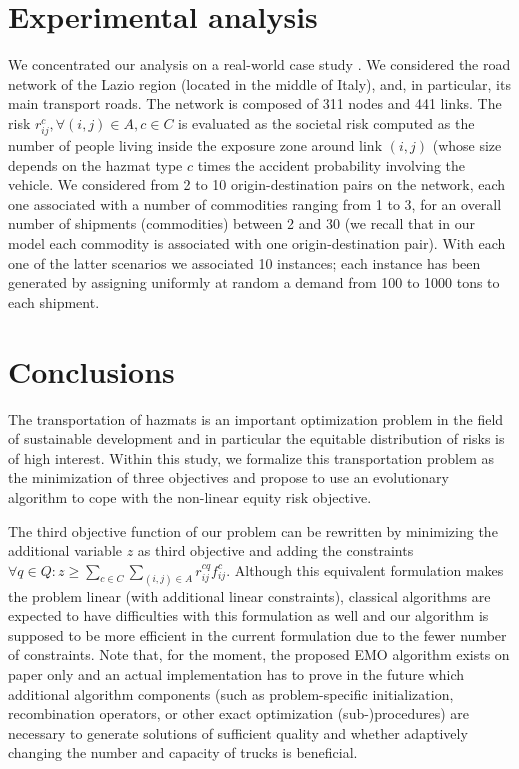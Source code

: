 \documentclass[preprint,12pt]{elsarticle}
\begin{document}
\section{Experimental analysis}

We concentrated our analysis on a real-world case study \cite{bianco09}. We considered the road network of the Lazio region (located in the middle of Italy), and, in particular, its main transport roads. The network is composed of 311 nodes and 441 links. The risk $r_{ij}^c, \forall (i,j) \in A, c \in C$ is evaluated as the societal risk computed as the number of people living inside the exposure zone around link $(i,j)$ (whose size depends on the hazmat type $c$ times the accident probability involving the vehicle. We considered from 2 to 10 origin-destination pairs on the network, each one associated with a number of commodities ranging from 1 to 3, for an overall number of shipments (commodities) between 2 and 30 (we recall that in our model each commodity is associated with one origin-destination pair). With each one of the latter scenarios we associated 10 instances; each instance has been generated by assigning uniformly at random a demand from 100 to 1000 tons to each shipment.







\section{Conclusions}
\label{S_FW}
The transportation of hazmats is an important optimization problem in the field of sustainable development and in particular the equitable distribution of risks is of high interest. Within this study, we formalize this transportation problem as the minimization of three objectives and propose to use an evolutionary algorithm to cope with the non-linear equity risk objective.

The third objective function of our problem can be rewritten by minimizing the additional variable $z$ as third objective and adding the constraints $\forall q \in Q: z \geq \sum_{c \in C} \sum_{(i,j) \in A} r_{ij}^{cq} f_{ij}^c$. Although this equivalent formulation makes the problem linear (with additional linear constraints), classical algorithms are expected to have difficulties with this formulation as well and our algorithm is supposed to be more efficient in the current formulation due to the fewer number of constraints. Note that, for the moment, the proposed EMO algorithm exists on paper only and an actual implementation has to prove in the future which additional algorithm components (such as problem-specific initialization, recombination operators, or other exact optimization (sub-)procedures) are necessary to generate solutions of sufficient quality and whether adaptively changing the number and capacity of trucks is beneficial.
\end{document}
